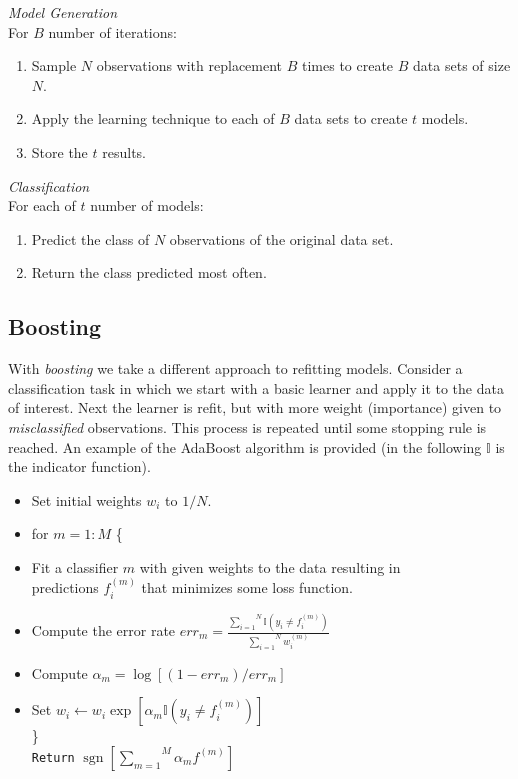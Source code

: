 \documentclass[english,nohyper,titlepage]{tufte-handout}\usepackage{knitr}
\newcommand{\sgn}{\operatorname{sgn}} %
\begin{document}
\medskip
\noindent \emph{Model Generation} \\
For $B$ number of iterations:
\begin{enumerate}
  \item Sample $N$ observations with replacement $B$ times to create $B$ data sets of size $N$.
  \item Apply the learning technique to each of $B$ data sets to create $t$ models.
  \item Store the $t$ results.
\end{enumerate}
\emph{Classification} \\
For each of $t$ number of models:
\begin{enumerate}
  \item Predict the class of $N$ observations of the original data set.
  \item Return the class predicted most often.
\end{enumerate}

\subsection{Boosting}
With \emph{boosting} we take a different approach to refitting models.  Consider a classification task in which we start with a basic learner and apply it to the data of interest.  Next the learner is refit, but with more weight (importance) given to \emph{misclassified} observations.  This process is repeated until some stopping rule is reached.  An example of the AdaBoost algorithm is provided (in the following $\mathbb{I}$ is the indicator function).

\medskip
\small
\begin{itemize}
  \item Set initial weights $w_i$ to $1/N$.
  \item for $m=1:M$ \quad\{
    \item \qquad Fit a classifier $m$ with given weights to the data resulting in  \\ \qquad predictions $f^{(m)}_i$ that minimizes some loss function.
    \item \qquad Compute the error rate $err_m = \frac{\overset{N}{\underset{i=1}{\sum}} \mathbb{I}(y_i\ne f^{(m)}_i)}{\overset{N}{\underset{i=1}{\sum}}w^{(m)}_i}$
    \item \qquad Compute $\alpha_m = \log[(1-err_m)/err_m]$
    \item \qquad Set $w_i \leftarrow w_i\exp[\alpha_m \mathbb{I}(y_i\ne f^{(m)}_i)]$ \\
    \} \\
    \texttt{Return} $\sgn [\overset{M}{\underset{m=1}{\sum}}\alpha_m f^{(m)}]$
\end{itemize}
\normalsize
\end{document}
